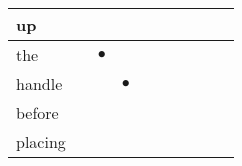 \documentclass[landscape]{article}
\newcommand{\ssp}{\hspace{2pt}}
\newcommand{\mex}{\cellcolor{g}$\bullet$}
\begin{document}
\begin{tabular}{|l|p{10pt}|p{10pt}|p{10pt}|p{10pt}|p{10pt}|p{10pt}|p{10pt}|p{10pt}|p{10pt}|}
\hline
\ssp up \ssp&\hspace{2pt}&\hspace{2pt}&\hspace{2pt}&\hspace{2pt}&\hspace{2pt}&\hspace{2pt}&\hspace{2pt}&\hspace{2pt}&\hspace{2pt}\\
\hline
\ssp \cellcolor{ref1}the \ssp&\hspace{2pt}&\hspace{2pt}\mex&\hspace{2pt}&\hspace{2pt}&\hspace{2pt}&\hspace{2pt}&\hspace{2pt}&\hspace{2pt}&\hspace{2pt}\\
\hline
\ssp \cellcolor{ref2}handle \ssp&\hspace{2pt}&\hspace{2pt}&\hspace{2pt}\mex&\hspace{2pt}&\hspace{2pt}&\hspace{2pt}&\hspace{2pt}&\hspace{2pt}&\hspace{2pt}\\
\hline
\ssp before \ssp&\hspace{2pt}&\hspace{2pt}&\hspace{2pt}&\hspace{2pt}&\hspace{2pt}&\hspace{2pt}&\hspace{2pt}&\hspace{2pt}&\hspace{2pt}\\
\hline
\ssp placing \ssp&\hspace{2pt}&\hspace{2pt}&\hspace{2pt}&\hspace{2pt}&\hspace{2pt}&\hspace{2pt}&\hspace{2pt}&\hspace{2pt}&\hspace{2pt}\\

\end{tabular}
\end{document}
